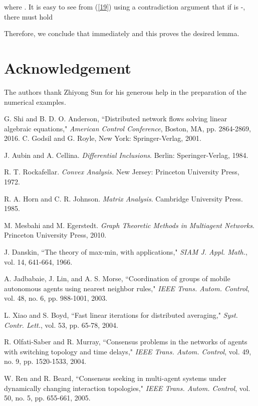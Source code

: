 \documentclass[a4paper, 11pt]{article}
\begin{document}
where . It is easy  to see from (\ref{19}) using  a contradiction argument that if   is -, there must hold
 
 Therefore, we conclude that  immediately and this proves the desired lemma.


\section*{Acknowledgement}
The authors  thank Zhiyong Sun for his generous help in the preparation of the numerical examples.


\begin{thebibliography}{99}
 G. Shi and B. D. O. Anderson, ``Distributed network flows solving linear algebraic equations," {\em American Control Conference}, Boston, MA, pp. 2864-2869, 2016.
C. Godsil and G. Royle,
\newblock New York: Springer-Verlag, 2001.

 J. Aubin and A. Cellina. {\em Differential Inclusions}.  Berlin: Speringer-Verlag, 1984.

R. T. Rockafellar. {\em Convex Analysis.} New Jersey: Princeton University Press, 1972.

  R. A. Horn  and C. R. Johnson. {\em  Matrix Analysis}. Cambridge
University Press. 1985.

 M. Mesbahi and M. Egerstedt. {\em Graph Theoretic Methods in Multiagent Networks}. Princeton University Press, 2010.

 J. Danskin, ``The theory of max-min, with applications,"
{\em SIAM J. Appl. Math.}, vol. 14, 641-664, 1966.

A. Jadbabaie, J. Lin, and A. S. Morse,
``Coordination of groups of mobile autonomous agents using nearest neighbor rules,"
{\em IEEE Trans. Autom. Control}, vol. 48, no. 6, pp. 988-1001, 2003.

  L. Xiao and S. Boyd, ``Fast linear iterations for distributed averaging,"
{\em Syst. Contr. Lett.}, vol. 53, pp. 65-78, 2004.

 R. Olfati-Saber and R. Murray, ``Consensus problems in the networks
of agents with switching topology and time delays," {\em  IEEE Trans.
Autom. Control}, vol. 49, no. 9, pp. 1520-1533, 2004.

 W. Ren and R. Beard, ``Consensus seeking in multi-agent systems under dynamically changing interaction topologies," {\em IEEE Trans. Autom. Control}, vol. 50, no. 5, pp. 655-661, 2005.


\end{thebibliography}
\end{document}
